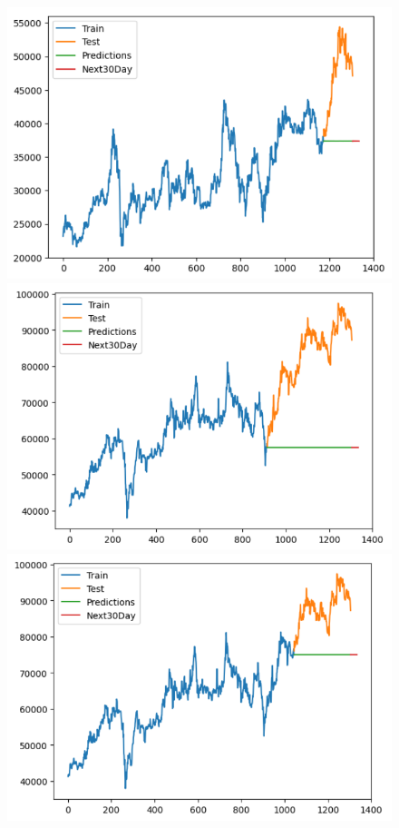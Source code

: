 \begin{figure}[H]
\begin{minipage}{0.15\textwidth}
    \centering
    \includegraphics[width=1\textwidth]{resources/chapter-5/newdata/result/BIDV_ARIMA_9-1.png}
    \end{minipage}
    \hfill
    \begin{minipage}{0.15\textwidth}
    \centering
    \includegraphics[width=1\textwidth]{resources/chapter-5/newdata/result/VCB_ARIMA_7-3.png}
    \end{minipage}
    \hfill
    \begin{minipage}{0.15\textwidth}
    \centering
    \includegraphics[width=1\textwidth]{resources/chapter-5/newdata/result/VCB_ARIMA_8-2.png}

\end{minipage}
\end{figure}
